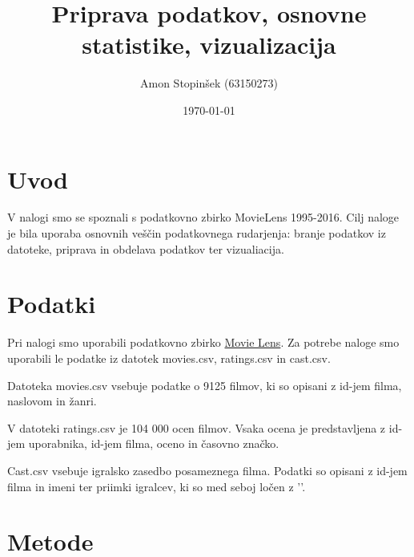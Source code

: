 \documentclass[a4paper,11pt]{article}
\title{Priprava podatkov, osnovne statistike, vizualizacija}
\author{Amon Stopinšek (63150273)}
\date{\today}
\begin{document}
\maketitle

\section{Uvod}

V nalogi smo se spoznali s podatkovno zbirko MovieLens 1995-2016. Cilj naloge je
bila uporaba osnovnih veščin podatkovnega rudarjenja: branje podatkov iz
datoteke, priprava in obdelava podatkov ter vizualiacija.

\section{Podatki}


Pri nalogi smo uporabili podatkovno zbirko
\href{https://grouplens.org/datasets/movielens/}{Movie Lens}. Za potrebe naloge
smo uporabili le podatke iz datotek movies.csv, ratings.csv in cast.csv.

Datoteka movies.csv vsebuje podatke o 9125 filmov, ki so opisani z id-jem filma,
naslovom in žanri.

V datoteki ratings.csv je 104 000 ocen filmov. Vsaka ocena je predstavljena z
id-jem uporabnika, id-jem filma, oceno in časovno značko.

Cast.csv vsebuje igralsko zasedbo posameznega filma. Podatki so opisani z id-jem
filma in imeni ter priimki igralcev, ki so med seboj ločen z '\textbar'.

\section{Metode}
\end{document}
